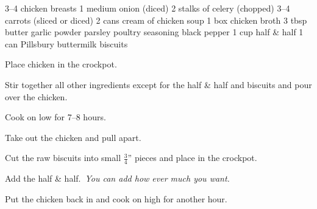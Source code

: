 \dishtype{\soup}
\begin{ingreds}
    3--4 chicken breasts
    1 medium onion (diced)
    2 stalks of celery (chopped)
    3--4 carrots (sliced or diced)
    2 cans cream of chicken soup
    1 box chicken broth
    3 tbsp butter
    garlic powder
    parsley
    poultry seasoning
    black pepper
    1 cup half \& half
    1 can Pillsbury\textsuperscript{\textregistered} buttermilk biscuits
\end{ingreds}
\begin{method}
    Place chicken in the crockpot.\par
    Stir together all other ingredients except for the half \& half and biscuits and pour over the chicken.\par
    Cook on low for 7--8 hours.\par
    Take out the chicken and pull apart.\par
    Cut the raw biscuits into small $\frac{3}{4}$'' pieces and place in the crockpot.\par
    Add the half \& half.\ \emph{You can add how ever much you want.}\par
    Put the chicken back in and cook on high for another hour.
\end{method}